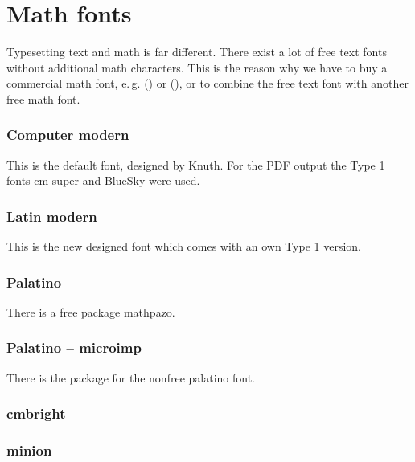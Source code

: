 \begin{table}[htb]
\part{Math fonts}
Typesetting text and math is far different. There exist a lot of free text fonts without
additional math characters. This is the reason why we have to buy a commercial math font, e.\,g. 
 () or  (), or to 
combine the free text font with another free math font.

\section{Computer modern}
This is the default font, designed by Knuth. For the PDF output
the Type 1 fonts cm-super and BlueSky were used.


\section{Latin modern}
This is the new designed font which comes with an own Type 1 version. 


\section{Palatino}
There is a free package mathpazo. 


\section{Palatino -- microimp}
There is the package  for the nonfree palatino font. 


\section{cmbright}


\section{minion}





\end{table}
